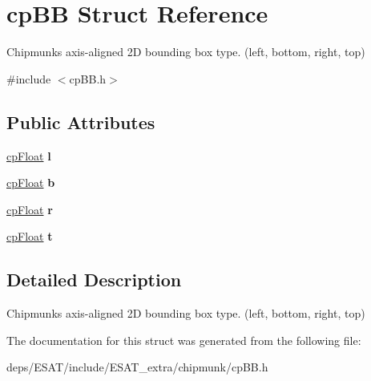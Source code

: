 \hypertarget{structcp_b_b}{}\section{cp\+BB Struct Reference}
\label{structcp_b_b}


Chipmunk\textquotesingle{}s axis-\/aligned 2D bounding box type. (left, bottom, right, top)  




{\ttfamily \#include $<$cp\+B\+B.\+h$>$}

\subsection*{Public Attributes}
\begin{DoxyCompactItemize}
\item 
\mbox{\label{structcp_b_b_a6f88af28bf75a4ddfd0115fbd24f27ab}} 
\mbox{\hyperlink{group__basic_types_gac1ed65573e035bf892505768c852d8d3}{cp\+Float}} {\bfseries l}
\item 
\mbox{\label{structcp_b_b_a8bdd6bf0baf92571d31a1ab85e63a183}} 
\mbox{\hyperlink{group__basic_types_gac1ed65573e035bf892505768c852d8d3}{cp\+Float}} {\bfseries b}
\item 
\mbox{\label{structcp_b_b_a552ee5c6597e79313bd5c85e7c6557af}} 
\mbox{\hyperlink{group__basic_types_gac1ed65573e035bf892505768c852d8d3}{cp\+Float}} {\bfseries r}
\item 
\mbox{\label{structcp_b_b_aee66985512eb137134d15ee6ac343bcd}} 
\mbox{\hyperlink{group__basic_types_gac1ed65573e035bf892505768c852d8d3}{cp\+Float}} {\bfseries t}
\end{DoxyCompactItemize}


\subsection{Detailed Description}
Chipmunk\textquotesingle{}s axis-\/aligned 2D bounding box type. (left, bottom, right, top) 

The documentation for this struct was generated from the following file\+:\begin{DoxyCompactItemize}
\item 
deps/\+E\+S\+A\+T/include/\+E\+S\+A\+T\+\_\+extra/chipmunk/cp\+B\+B.\+h\end{DoxyCompactItemize}
